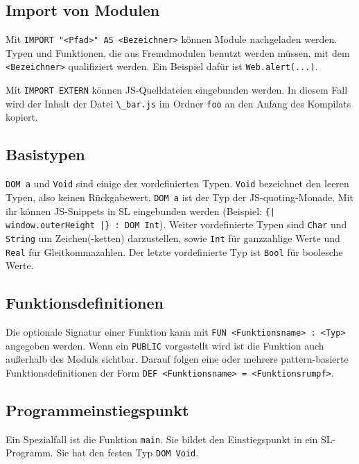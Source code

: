 \documentclass[12pt,bibtotoc]{scrreprt}
\begin{document}
\subsection{Import von Modulen}

Mit \lstinline!IMPORT "<Pfad>" AS <Bezeichner>! können Module nachgeladen werden. Typen und Funktionen, die aus Fremdmodulen benutzt werden müssen, mit dem \lstinline!<Bezeichner>! qualifiziert werden. Ein Beispiel dafür ist \lstinline!Web.alert(...)!. 
  
  Mit \lstinline!IMPORT EXTERN! können \ac{JS}-Quelldateien eingebunden werden. In diesem Fall wird der Inhalt der Datei \lstinline!\_bar.js! im Ordner \lstinline!foo! an den Anfang des Kompilats kopiert.

\subsection{Basistypen}

\lstinline!DOM a! und \lstinline!Void! sind einige der vordefinierten Typen. \lstinline!Void! bezeichnet den leeren Typen, also keinen Rückgabewert. \lstinline!DOM a! ist der Typ der JS-quoting-Monade. Mit ihr können JS-Snippets in SL eingebunden werden (Beispiel: \lstinline!{| window.outerHeight |} : DOM Int!). Weiter vordefinierte Typen sind \lstinline!Char! und \lstinline!String! um Zeichen(-ketten) darzustellen, sowie \lstinline!Int! für ganzzahlige Werte und \lstinline!Real! für Gleitkommazahlen. Der letzte vordefinierte Typ ist \lstinline!Bool! für boolesche Werte.
  
\subsection{Funktionsdefinitionen}

Die optionale Signatur einer Funktion kann mit \lstinline!FUN <Funktionsname> : <Typ>! angegeben werden. Wenn ein \lstinline!PUBLIC! vorgestellt wird ist die Funktion auch außerhalb des Moduls sichtbar. Darauf folgen eine oder mehrere pattern-basierte Funktionsdefinitionen der Form \lstinline!DEF <Funktionsname> = <Funktionsrumpf>!.


\subsection{Programmeinstiegspunkt}

Ein Spezialfall ist die Funktion \lstinline!main!. Sie bildet den Einstiegspunkt in ein SL-Programm. Sie hat den festen Typ \lstinline!DOM Void!. 
\end{document}
